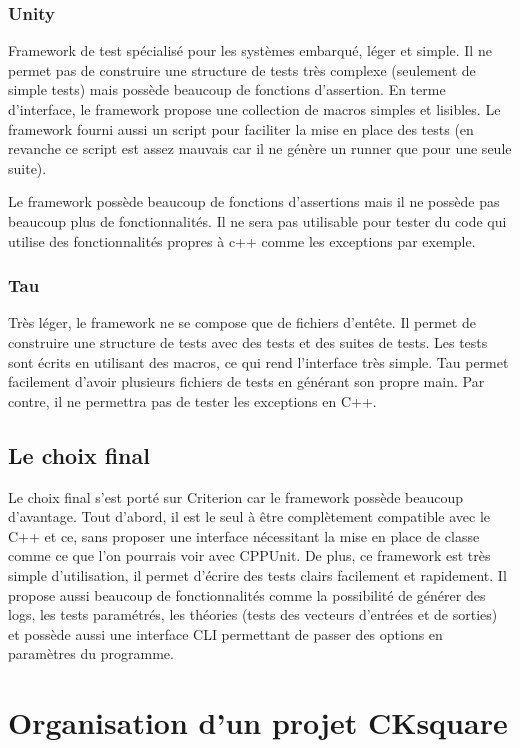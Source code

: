 \documentclass[a4paper]{article}
\begin{document}
\subsubsection*{Unity}

Framework de test spécialisé pour les systèmes embarqué, léger et simple. Il ne
permet pas de construire une structure de tests très complexe (seulement de
simple tests) mais possède beaucoup de fonctions d'assertion. En terme
d'interface, le framework propose une collection de macros simples et lisibles.
Le framework fourni aussi un script pour faciliter la mise en place des tests
(en revanche ce script est assez mauvais car il ne génère un runner que pour une
seule suite).

Le framework possède beaucoup de fonctions d'assertions mais il ne possède pas
beaucoup plus de fonctionnalités. Il ne sera pas utilisable pour tester du code
qui utilise des fonctionnalités propres à c++ comme les exceptions par exemple.

\subsubsection*{Tau}

Très léger, le framework ne se compose que de fichiers d'entête. Il permet de
construire une structure de tests avec des tests et des suites de tests. Les
tests sont écrits en utilisant des macros, ce qui rend l'interface très simple.
Tau permet facilement d'avoir plusieurs fichiers de tests en générant son propre
main. Par contre, il ne permettra pas de tester les exceptions en C++.
\subsection{Le choix final}%

Le choix final s'est porté sur Criterion car le framework possède beaucoup
d'avantage. Tout d'abord, il est le seul à être complètement compatible avec le
C++ et ce, sans proposer une interface nécessitant la mise en place de classe
comme ce que l'on pourrais voir avec CPPUnit. De plus, ce framework est très
simple d'utilisation, il permet d'écrire des tests clairs facilement et
rapidement. Il propose aussi beaucoup de fonctionnalités comme la possibilité de
générer des logs, les tests paramétrés, les théories (tests des vecteurs
d'entrées et de sorties) et possède aussi une interface CLI permettant de passer
des options en paramètres du programme.
\section{Organisation d'un projet CKsquare}
\end{document}
